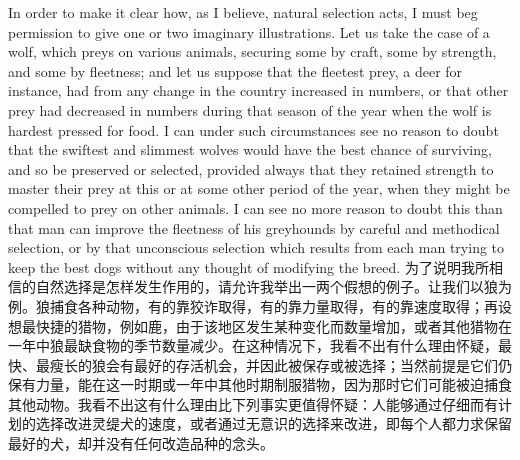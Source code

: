 \darwinpair
{In order to make it clear how, as I believe, natural selection acts, I must beg permission to give one or two imaginary illustrations. Let us take the case of a wolf, which preys on various animals, securing some by craft, some by strength, and some by fleetness; and let us suppose that the fleetest prey, a deer for instance, had from any change in the country increased in numbers, or that other prey had decreased in numbers during that season of the year when the wolf is hardest pressed for food. I can under such circumstances see no reason to doubt that the swiftest and slimmest wolves would have the best chance of surviving, and so be preserved or selected, provided always that they retained strength to master their prey at this or at some other period of the year, when they might be compelled to prey on other animals. I can see no more reason to doubt this than that man can improve the fleetness of his greyhounds by careful and methodical selection, or by that unconscious selection which results from each man trying to keep the best dogs without any thought of modifying the breed.}
{为了说明我所相信的自然选择是怎样发生作用的，请允许我举出一两个假想的例子。让我们以狼为例。狼捕食各种动物，有的靠狡诈取得，有的靠力量取得，有的靠速度取得；再设想最快捷的猎物，例如鹿，由于该地区发生某种变化而数量增加，或者其他猎物在一年中狼最缺食物的季节数量减少。在这种情况下，我看不出有什么理由怀疑，最快、最瘦长的狼会有最好的存活机会，并因此被保存或被选择；当然前提是它们仍保有力量，能在这一时期或一年中其他时期制服猎物，因为那时它们可能被迫捕食其他动物。我看不出这有什么理由比下列事实更值得怀疑：人能够通过仔细而有计划的选择改进灵缇犬的速度，或者通过无意识的选择来改进，即每个人都力求保留最好的犬，却并没有任何改造品种的念头。}

